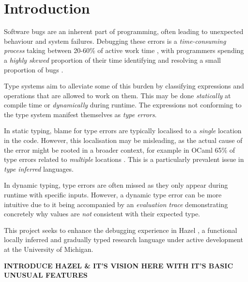 \chapter{Introduction}
Software bugs are an inherent part of programming, often leading to unexpected behaviour and system failures. Debugging these errors is a \textit{time-consuming process} taking between 20-60\% of active work time \cite{DebugTimeSelfReport}, with programmers spending a \textit{highly skewed} proportion of their time identifying and resolving a small proportion of bugs \cite{DebugSkew}.

Type systems aim to alleviate some of this burden by classifying expressions and operations that are allowed to work on them. This may be done \textit{statically} at compile time or \textit{dynamically} during runtime. The expressions not conforming to the type system manifest themselves as \textit{type errors}.

In static typing, blame for type errors are typically localised to a \textit{single} location in the code. However, this localisation may be misleading, as the actual cause of the error might be rooted in a broader context, for example in OCaml 65\% of type errors related to \textit{multiple} locations \cite{StudentTypeErrorFixes}. This is a particularly prevalent issue in \textit{type inferred} languages.

In dynamic typing, type errors are often missed as they only appear during runtime with specific inputs. However, a dynamic type error can be more intuitive due to it being accompanied by an \textit{evaluation trace} demonstrating concretely why values are \textit{not} consistent with their expected type.

This project seeks to enhance the debugging experience in Hazel \cite{Hazel}, a functional locally inferred and gradually typed research language under active development at the University of Michigan. 

\textbf{INTRODUCE HAZEL \& IT'S VISION HERE WITH IT'S BASIC UNUSUAL FEATURES}

